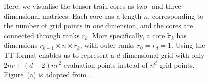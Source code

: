 \begin{figure}[ht!]
	\centering
\begin{subfigure}{\textwidth}
	
	\caption{}
\end{subfigure}
	\centering
\begin{subfigure}{\textwidth}
	\caption{}
\end{subfigure}
\caption[Visualisation of a tensor train]{Here, we visualise the tensor train cores as two- and three-dimensional matrices. 
Each core has a length $n$, corresponding to the number of grid points in one dimension, and the cores are connected through ranks $r_k$. 
More specifically, a core $\tilde{\pi}_k$ has dimensions $r_{k-1} \times n \times r_k$, with outer ranks $r_0 = r_d = 1$.
Using the TT-format enables us to represent a $d$-dimensional grid with only $2nr + (d-2)nr^2$ evaluation points instead of $n^d$ grid points.
Figure~(a) is adapted from~\cite{fox2021grid}.}
\label{fig:TTfig}
\end{figure}



